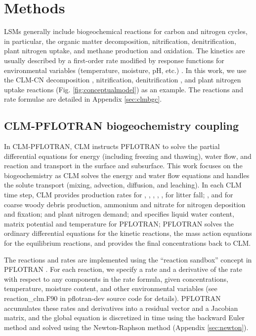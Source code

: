 \documentclass[gmd, manuscript]{copernicus}
\begin{document}
\section{Methods}
LSMs generally include biogeochemical reactions for carbon and nitrogen cycles, in particular, the organic matter decomposition, nitrification, denitrification, plant nitrogen uptake,  and methane production and oxidation. The kinetics are usually described by a first-order rate modified by response functions for environmental variables (temperature, moisture, pH, etc.) \citep{Bonan2012,Boyer2006,Schmidt2011}.  In this work, we use the CLM-CN decomposition \citep{Bonan2012,Oleson2013,Thornton2005}, nitrification, denitrification \citep{Dickinson2002,Parton2001,Parton1996}, and plant nitrogen uptake reactions (Fig. \ref{fig:conceptualmodel}) as an example. The reactions and rate formulae are detailed in Appendix \ref{sec:clmbgc}.

\subsection{CLM-PFLOTRAN biogeochemistry coupling}
In CLM-PFLOTRAN, CLM instructs PFLOTRAN to solve the partial differential equations for energy (including freezing and thawing), water flow, and reaction
and transport in the surface and subsurface. This work focuses on the biogeochemistry as CLM solves the energy and water flow equations and handles the solute transport (mixing, advection, diffusion, and leaching). In each CLM time step, CLM provides production rates for , , , , ,  for litter fall; , and  for coarse woody debris production, ammonium and nitrate for nitrogen deposition and fixation; and plant nitrogen demand; and specifies liquid water content, matrix potential and temperature for PFLOTRAN; PFLOTRAN solves the ordinary differential equations for the kinetic reactions, the mass action equations for the equilibrium reactions, and provides the final concentrations back to CLM.   

The reactions and rates are implemented using the ``reaction sandbox'' concept in PFLOTRAN \citep{Lichtner2015}. For each reaction, we specify a rate and a derivative of the rate with respect to any components in the rate formula, given concentrations, temperature, moisture content, and other environmental variables (see reaction\_clm.F90 in pflotran-dev source code for details). PFLOTRAN accumulates these rates and derivatives into a residual vector and a Jacobian matrix, and the global equation is discretized in time using the backward Euler method and solved using the Newton-Raphson method (Appendix \ref{sec:newton}).
\end{document}
